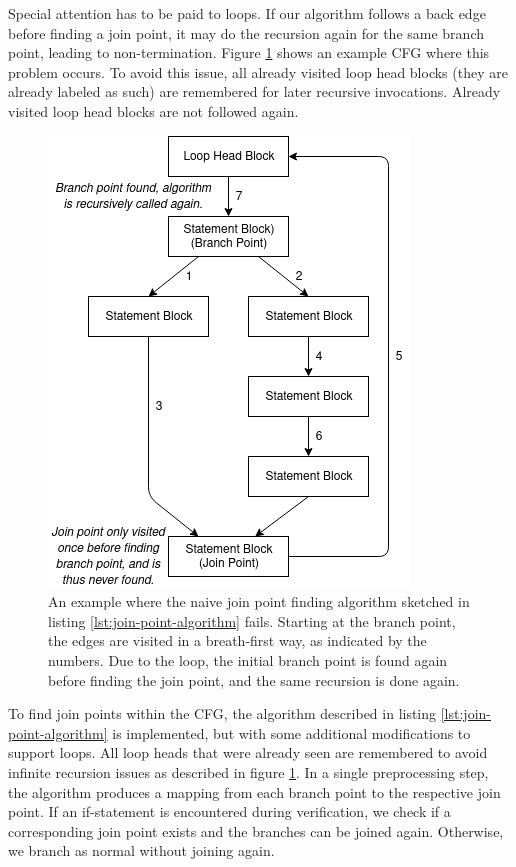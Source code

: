 \documentclass[11pt]{article}
\begin{document}
    Special attention has to be paid to loops. If our algorithm follows a back edge before finding a join point,
    it may do the recursion again for the same branch point, leading to non-termination.
    Figure \ref{fig:join-point-problem} shows an example CFG where this problem occurs.
    To avoid this issue, all already visited loop head blocks (they are already labeled as such)
    are remembered for later recursive invocations. Already visited loop head blocks are not followed again.
    
    \begin{figure}[H]
        \begin{center}
            \includegraphics[width=0.6\linewidth]{join-point-problem.png}
            \caption{
                An example where the naive join point finding algorithm sketched in 
                listing \ref{lst:join-point-algorithm}
                fails. Starting at the branch point, the edges are visited in a breath-first way, as indicated by
                the numbers. Due to the loop, the initial branch point is found again before finding
                the join point, and the same recursion is done again.
            }
            \label{fig:join-point-problem}
        \end{center}   
    \end{figure}

    To find join points within the CFG, the algorithm described in listing \ref{lst:join-point-algorithm} is implemented,
    but with some additional modifications to support loops. All loop heads that
    were already seen are remembered to avoid infinite recursion issues as described
    in figure \ref{fig:join-point-problem}.
    In a single preprocessing step, the algorithm produces a mapping from each branch point to the respective join point.
    If an if-statement is encountered during verification, we check if a 
    corresponding join point exists and the branches can be joined again.
    Otherwise, we branch as normal without joining again.
\end{document}
